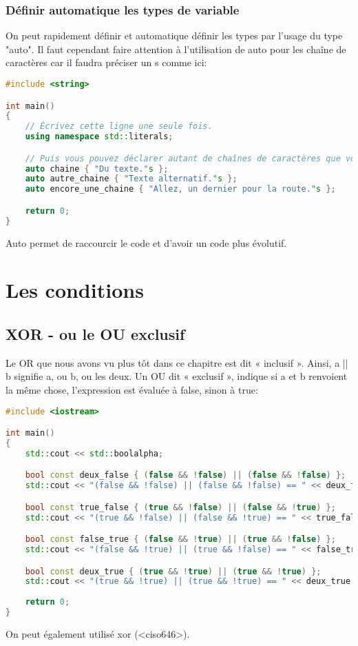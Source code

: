 \documentclass{article}
\begin{document}
\subsubsection{Définir automatique les types de variable}
On peut rapidement définir et automatique définir les types par l'usage du type "auto". Il faut cependant faire attention à l'utilisation de auto pour les chaîne de caractères car il faudra préciser un s comme ici:
\begin{lstlisting}[language =C++]
    #include <string>

int main()
{
    // Écrivez cette ligne une seule fois.
    using namespace std::literals;

    // Puis vous pouvez déclarer autant de chaînes de caractères que vous voulez.
    auto chaine { "Du texte."s };
    auto autre_chaine { "Texte alternatif."s };
    auto encore_une_chaine { "Allez, un dernier pour la route."s };

    return 0;
}

\end{lstlisting}{}
Auto permet de raccourcir le code et d'avoir un code plus évolutif.

\section{Les conditions}
\subsection{XOR - ou le OU exclusif}
Le OR que nous avons vu plus tôt dans ce chapitre est dit « inclusif ». Ainsi, a || b signifie a, ou b, ou les deux. Un OU dit « exclusif », indique si a et b renvoient la même chose, l’expression est évaluée à false, sinon à true:
\begin{lstlisting}[language=C++]
    #include <iostream>

int main()
{
    std::cout << std::boolalpha;

    bool const deux_false { (false && !false) || (false && !false) };
    std::cout << "(false && !false) || (false && !false) == " << deux_false << std::endl;

    bool const true_false { (true && !false) || (false && !true) };
    std::cout << "(true && !false) || (false && !true) == " << true_false << std::endl;

    bool const false_true { (false && !true) || (true && !false) };
    std::cout << "(false && !true) || (true && !false) == " << false_true << std::endl;

    bool const deux_true { (true && !true) || (true && !true) };
    std::cout << "(true && !true) || (true && !true) == " << deux_true << std::endl;
    
    return 0;
}
\end{lstlisting}
On peut également utilisé xor (<ciso646>).
\end{document}
